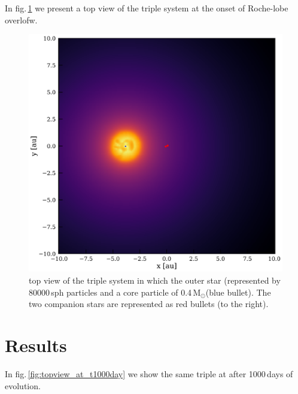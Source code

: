 \documentclass{aastex62}
\newcommand{\MSun}{\mbox{M$_\odot$}}
\begin{document}
In fig.\,\ref{fig:topview_at_t0} we present a top view of the triple
system at the onset of Roche-lobe overlofw.  

\begin{figure}[ht!]
  \includegraphics[width=\columnwidth]{fig_t0_N80000_M012MSun1109MSun_a02au_e00_inc9deg.pdf}
\caption{top view of the triple system in which the outer star
  (represented by 80000\,sph particles and a core particle of
  0.4\,\MSun (blue bullet). The two companion stars are represented as
  red bullets (to the right).
\label{fig:topview_at_t0}}
\end{figure}

\section{Results} \label{results}

In fig.\,\ref{fig:topview_at_t1000day} we show the same triple at
after 1000\,days of evolution.
\end{document}
